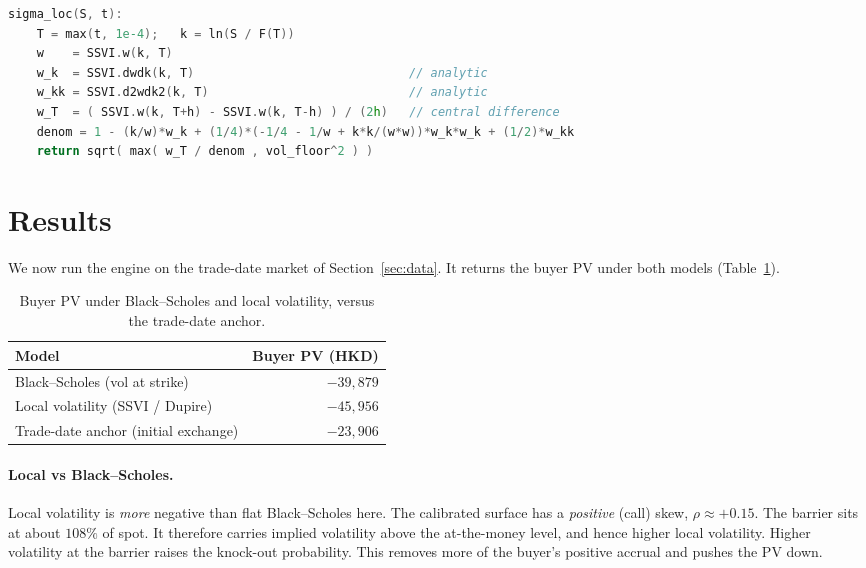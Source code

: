\documentclass[11pt]{article}
\begin{document}
\begin{lstlisting}[language=C++,caption={Dupire local volatility from the SSVI fit (\texttt{local\_vol.hpp}).},captionpos=b]
sigma_loc(S, t):
    T = max(t, 1e-4);   k = ln(S / F(T))
    w    = SSVI.w(k, T)
    w_k  = SSVI.dwdk(k, T)                              // analytic
    w_kk = SSVI.d2wdk2(k, T)                            // analytic
    w_T  = ( SSVI.w(k, T+h) - SSVI.w(k, T-h) ) / (2h)   // central difference
    denom = 1 - (k/w)*w_k + (1/4)*(-1/4 - 1/w + k*k/(w*w))*w_k*w_k + (1/2)*w_kk
    return sqrt( max( w_T / denom , vol_floor^2 ) )
\end{lstlisting}

\section{Results}\label{sec:results}
We now run the engine on the trade-date market of Section~\ref{sec:data}. It returns the buyer PV
under both models (Table~\ref{tab:results}).

\begin{table}[h]\centering\small
\begin{tabular}{@{}lr@{}}
\toprule
Model & Buyer PV (HKD) \\
\midrule
Black--Scholes (vol at strike) & $-39{,}879$ \\
Local volatility (SSVI / Dupire) & $-45{,}956$ \\
\midrule
Trade-date anchor (initial exchange) & $-23{,}906$ \\
\bottomrule
\end{tabular}
\caption{Buyer PV under Black--Scholes and local volatility, versus the trade-date anchor.}
\label{tab:results}
\end{table}

\paragraph{Local vs Black--Scholes.} Local volatility is \emph{more} negative than flat
Black--Scholes here. The calibrated surface has a \emph{positive} (call) skew, $\rho\approx+0.15$. The barrier sits at about $108\%$ of spot. It
therefore carries implied volatility above the at-the-money level, and hence higher local
volatility. Higher volatility at the barrier raises the knock-out probability. This removes more of
the buyer's positive accrual and pushes the PV down.
\end{document}
